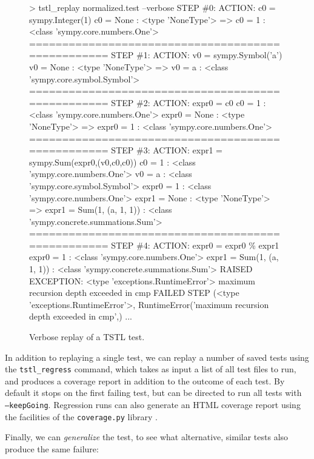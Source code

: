 \begin{figure}
{\scriptsize
\begin{code}
 > tstl\_replay normalized.test --verbose
 STEP \#0: ACTION: c0 = sympy.Integer(1) 
 c0 = None : <type 'NoneType'>
 => c0 = 1 : <class 'sympy.core.numbers.One'>
 ==================================================
 STEP \#1: ACTION: v0 = sympy.Symbol('a') 
 v0 = None : <type 'NoneType'>
 => v0 = a : <class 'sympy.core.symbol.Symbol'>
 ==================================================
 STEP \#2: ACTION: expr0 = c0 
 c0 = 1 : <class 'sympy.core.numbers.One'>
 expr0 = None : <type 'NoneType'>
 => expr0 = 1 : <class 'sympy.core.numbers.One'>
 ==================================================
 STEP \#3: ACTION: expr1 = sympy.Sum(expr0,(v0,c0,c0)) 
 c0 = 1 : <class 'sympy.core.numbers.One'>
 v0 = a : <class 'sympy.core.symbol.Symbol'>
 expr0 = 1 : <class 'sympy.core.numbers.One'>
 expr1 = None : <type 'NoneType'>
 => expr1 = Sum(1, (a, 1, 1)) : <class 'sympy.concrete.summations.Sum'>
 ==================================================
 STEP \#4: ACTION: expr0 = expr0 \% expr1 
 expr0 = 1 : <class 'sympy.core.numbers.One'>
 expr1 = Sum(1, (a, 1, 1)) : <class 'sympy.concrete.summations.Sum'>
 RAISED EXCEPTION: <type 'exceptions.RuntimeError'>
   maximum recursion depth exceeded in cmp
 FAILED STEP
 (<type 'exceptions.RuntimeError'>,
 RuntimeError('maximum recursion depth exceeded in cmp',)
 ...
\end{code}
}
\caption{Verbose replay of a TSTL test.}
\label{fig:verbose}
\end{figure}

In addition to replaying a single test, we can replay a number of
saved tests using the {\tt tstl\_regress} command, which takes as
input a list of all test files to run, and produces a coverage report
in addition to the outcome of each test.  By default it stops on the
first failing test, but can be directed to run all tests with {\tt
  --keepGoing}.  Regression runs can also generate an HTML coverage report using the
facilities of the {\tt coverage.py} library \cite{Coveragepy}.

Finally, we can \emph{generalize} the test, to see what
alternative, similar tests also produce the same failure:

